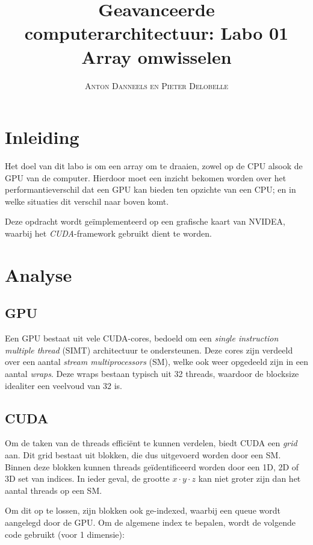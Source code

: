 \documentclass[10pt, twocolumn, a4paper]{article}
\begin{document}
\title{Geavanceerde computerarchitectuur: Labo 01 \\ 
\large{Array omwisselen}}
\author{\textsc{Anton Danneels en Pieter Delobelle}}
\date{}
\maketitle

\section{Inleiding}
Het doel van dit labo is om een array om te draaien, zowel op de CPU alsook de GPU van de computer. 
Hierdoor moet een inzicht bekomen worden over het performantieverschil dat een GPU kan bieden ten opzichte van een CPU; en in welke situaties dit verschil naar boven komt.

Deze opdracht wordt ge\"implementeerd op een grafische kaart van NVIDEA, waarbij het \emph{CUDA}-framework gebruikt dient te worden. 

\section{Analyse}

\subsection{GPU}
Een GPU bestaat uit vele CUDA-cores, bedoeld om een \emph{single instruction multiple thread} (SIMT) architectuur te ondersteunen. Deze cores zijn verdeeld over een aantal \emph{stream multiprocessors} (SM), welke ook weer opgedeeld zijn in een aantal \emph{wraps}. Deze wraps bestaan typisch uit 32 threads, waardoor de blocksize idealiter een veelvoud van 32 is.

\subsection{CUDA}
Om de taken van de threads effici\"ent te kunnen verdelen, biedt CUDA een \emph{grid} aan. Dit grid bestaat uit blokken, die dus uitgevoerd worden door een SM. Binnen deze blokken kunnen threads ge\"identificeerd worden door een 1D, 2D of 3D set van indices. In ieder geval, de grootte $x \cdot y \cdot z$ kan niet groter zijn dan het aantal threads op een SM.

Om dit op te lossen, zijn blokken ook ge-indexed, waarbij een queue wordt aangelegd door de GPU. Om de algemene index te bepalen, wordt de volgende code gebruikt (voor 1 dimensie): 
\end{document}
